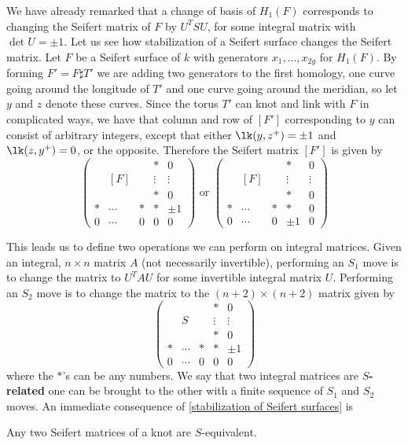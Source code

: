 We have already remarked that a change of basis of $H_1(F)$ corresponds to changing the Seifert matrix of $F$ by $U^TSU$, for some integral matrix with $\det U = \pm 1$. Let us see how stabilization of a Seifert surface changes the Seifert matrix. Let $F$ be a Seifert surface of $k$ with generators $x_1,\ldots,x_{2g}$ for $H_1(F)$. By forming $F' = F \sharp T'$ we are adding two generators to the first homology, one curve going around the longitude of $T'$ and one curve going around the meridian, so let $y$ and $z$ denote these curves. Since the torus $T'$ can knot and link with $F$ in complicated ways, we have that column and row of $[F']$ corresponding to $y$ can consist of arbitrary integers, except that either $\lk(y,z^+)=\pm 1$ and $\lk(z,y^+)=0$, or the opposite. Therefore the Seifert matrix $[F']$ is given by
\[ \begin{pmatrix}  & & & * & 0 \\ & [F] & & \vdots & \vdots \\ & & & * & 0 \\ * & \cdots & * & * & \pm 1 \\ 0 & \cdots & 0 & 0& 0 \end{pmatrix}  \text{\ \ \ \ \ or \ \ \ \ \ } \begin{pmatrix}  & & & * & 0 \\ & [F] & & \vdots & \vdots \\ & & & * & 0 \\ * & \cdots & * & * & 0 \\ 0 & \cdots & 0 & \pm 1 & 0 \end{pmatrix} \]

This leads us to define two operations we can perform on integral matrices. Given an integral, $n \times n$ matrix $A$ (not necessarily invertible), performing an $S_1$ move is to change the matrix to $U^TAU$ for some invertible integral matrix $U$. Performing an $S_2$ move is to change the matrix to the $(n+2) \times (n+2)$ matrix given by
\begin{equation}
\label{S_2 move}
\begin{pmatrix}  & & & * & 0 \\ & S & & \vdots & \vdots \\ & & & * & 0 \\ * & \cdots & * & * & \pm 1 \\ 0 & \cdots & 0 & 0& 0 \end{pmatrix}
\end{equation}
where the $*$'s can be any numbers. We say that two integral matrices are \textbf{$S$-related} one can be brought to the other with a finite sequence of $S_1$ and $S_2$ moves. An immediate consequence of \cref{stabilization of Seifert surfaces} is
\begin{cor}
\label{Seifert matrices are S-equivalent}
Any two Seifert matrices of a knot are $S$-equivalent.
\end{cor}

